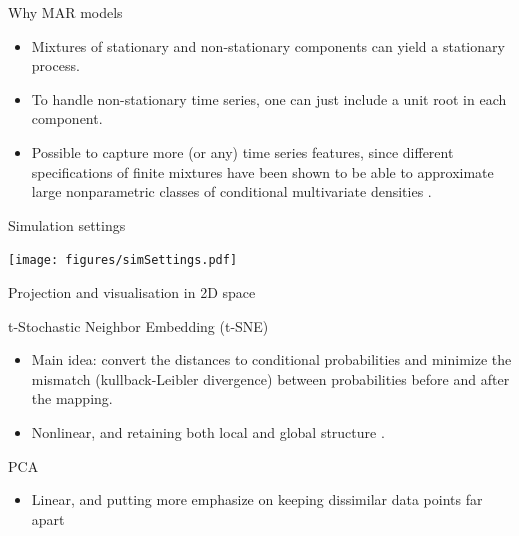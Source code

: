 \documentclass[11pt,ignorenonframetext,compress]{beamer}
\providecommand{\tightlist}{%
  \setlength{\itemsep}{0pt}\setlength{\parskip}{0pt}}
\begin{document}
\begin{frame}{Why MAR models}

  \begin{itemize}
    \tightlist
  \item
    Mixtures of stationary and non-stationary components can yield a
    stationary process.
  \item
    To handle non-stationary time series, one can just include a unit root
    in each component.
  \item
    Possible to capture more (or any) time series features, since
    different specifications of finite mixtures have been shown to be able
    to approximate large nonparametric classes of conditional multivariate
    densities \citep{jiang1999on, li2010flexible, norets2010approximation}.
  \end{itemize}

\end{frame}

\begin{frame}{Simulation settings}

  \centerline{\texttt{[image: figures/simSettings.pdf]}}

\end{frame}

\begin{frame}{Projection and visualisation in 2D space}

  \begin{block}{t-Stochastic Neighbor Embedding (t-SNE)}

    \begin{itemize}
      \tightlist
    \item
      Main idea: convert the distances to conditional probabilities and
      minimize the mismatch (kullback-Leibler divergence) between
      probabilities before and after the mapping.

    \item Nonlinear, and retaining both local and global structure
      \citep{maaten2008visualizing,van2014accelerating}.
    \end{itemize}

  \end{block}

  \begin{block}{PCA}

    \begin{itemize}
      \tightlist
    \item
      Linear, and putting more emphasize on keeping dissimilar data points
      far apart
    \end{itemize}

  \end{block}

\end{frame}
\end{document}
